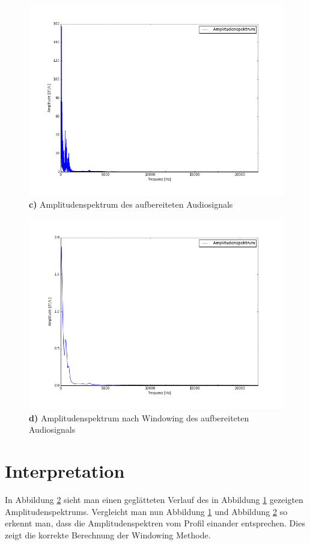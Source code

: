 \documentclass[12pt,oneside,a4paper]{report}
\begin{document}
\begin{figure}[H]
\centering\small
\includegraphics [scale=0.45]{src/Aufnahme1TriggerCutFFT.png}
\caption{ \textbf{c)} Amplitudenspektrum des aufbereiteten Audiosignals}
\label{fig:AUA_TriggerCutFFT}
\end{figure}

\begin{figure}[H]
\centering\small
\includegraphics [scale=0.45]{src/Aufnahme1TriggerCutWindow.png}
\caption{ \textbf{d)} Amplitudenspektrum nach Windowing des aufbereiteten Audiosignals}
\label{fig:AUA_TriggerCutWindow}
\end{figure}



\section{Interpretation}
\label{chap:VERSUCH_1_INTERPRETATION}
In Abbildung \ref{fig:AUA_TriggerCutWindow} sieht man einen geglätteten Verlauf des in Abbildung \ref{fig:AUA_TriggerCutFFT} gezeigten Amplitudenspektrums.
Vergleicht man nun Abbildung \ref{fig:AUA_TriggerCutFFT} und Abbildung \ref{fig:AUA_TriggerCutWindow} so erkennt man, dass die Amplitudenspektren vom  Profil einander entsprechen. Dies zeigt die korrekte Berechnung der Windowing Methode. 
\end{document}
